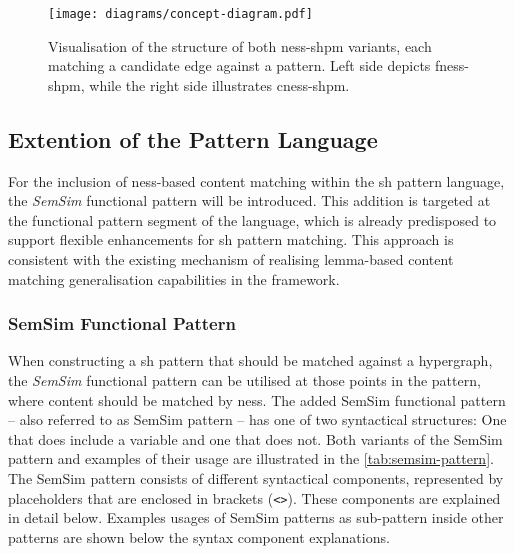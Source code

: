 \documentclass[11pt, numbers=noenddot]{scrreprt}
\begin{document}
\begin{figure}
\centering
\texttt{[image: diagrams/concept-diagram.pdf]}
\caption{Visualisation of the structure of both \gls{ness-shpm} variants, each matching a candidate edge against a pattern. Left side depicts \gls{fness-shpm}, while the right side illustrates \gls{cness-shpm}.}
\label{fig:concept-diagram}
\end{figure}



\subsection{Extention of the Pattern Language}
\label{sec:extension-pattern-language}
For the inclusion of \gls{ness}-based content matching within the \gls{sh} pattern language, the \textit{SemSim} functional pattern will be introduced. This addition is targeted at the functional pattern segment of the language, which is already predisposed to support flexible enhancements for \gls{sh} pattern matching. This approach is consistent with the existing mechanism of realising lemma-based content matching generalisation capabilities in the framework.


\subsubsection{SemSim Functional Pattern}
When constructing a \gls{sh} pattern that should be matched against a hypergraph, the \textit{SemSim} functional pattern can be utilised at those points in the pattern, where content should be matched by \gls{ness}. The added SemSim functional pattern -- also referred to as SemSim pattern -- has one of two syntactical structures: One that does include a variable and one that does not. 
Both variants of the SemSim pattern and examples of their usage are illustrated in the \cref{tab:semsim-pattern}. The SemSim pattern consists of different syntactical components, represented by placeholders that are enclosed in brackets (\texttt{<>}). These components are explained in detail below. Examples usages of SemSim patterns as sub-pattern inside other patterns are shown below the syntax component explanations.
\end{document}

